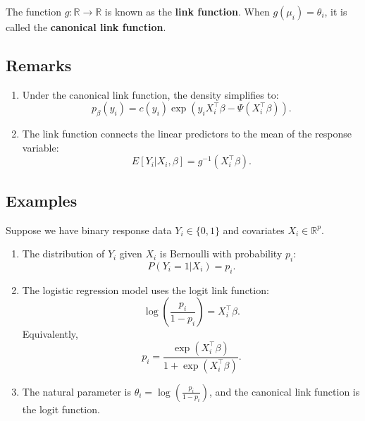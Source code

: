 \documentclass[open=any, 11pt,paper=A4]{scrreprt}
\begin{document}
The function $g: \mathbb{R} \rightarrow \mathbb{R}$ is known as the \textbf{link function}. When $g(\mu_i) = \theta_i$, it is called the \textbf{canonical link function}.

\subsection{Remarks}

\begin{enumerate}
    \item Under the canonical link function, the density simplifies to:
    \[
    p_\beta(y_i) = c(y_i) \exp\left( y_i X_i^\top \beta - \Psi(X_i^\top \beta) \right).
    \]
    \item The link function connects the linear predictors to the mean of the response variable:
    \[
    E[Y_i | X_i, \beta] = g^{-1}(X_i^\top \beta).
    \]
\end{enumerate}

\subsection{Examples}

\begin{example}
Suppose we have binary response data $Y_i \in \{0, 1\}$ and covariates $X_i \in \mathbb{R}^p$.

\begin{enumerate}
    \item The distribution of $Y_i$ given $X_i$ is Bernoulli with probability $p_i$:
    \[
    P(Y_i = 1 | X_i) = p_i.
    \]
    \item The logistic regression model uses the logit link function:
    \[
    \log\left( \frac{p_i}{1 - p_i} \right) = X_i^\top \beta.
    \]
    Equivalently,
    \[
    p_i = \frac{\exp(X_i^\top \beta)}{1 + \exp(X_i^\top \beta)}.
    \]
    \item The natural parameter is $\theta_i = \log\left( \frac{p_i}{1 - p_i} \right)$, and the canonical link function is the logit function.
\end{enumerate}
\end{example}
\end{document}
